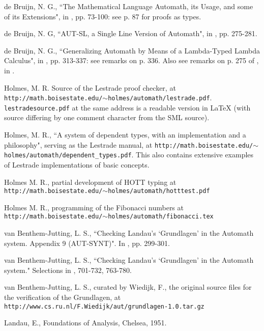 \documentclass{article}
\begin{document}
\begin{thebibliography}{99}

 de Bruijn, N. G., ``The Mathematical Language Automath, its Usage, and some of its Extensions", in \cite{yellowbook}, pp. 73-100:  see p. 87 for proofs as types.

   de Bruijn, N. G, ``AUT-SL, a Single Line Version of Automath", in \cite{yellowbook}, pp. 275-281.

  de Bruijn, N. G., ``Generalizing Automath by Means of a Lambda-Typed Lambda Calculus", in \cite{yellowbook}, pp. 313-337:  see remarks on p. 336.  Also see remarks on p. 275 of \cite{yellowbook}, in \cite{autsl}.

 

  Holmes, M. R.  Source of the Lestrade proof checker, at {\tt http://math.boisestate.edu/$\sim$holmes/automath/lestrade.pdf}.  {\tt lestradesource.pdf}
at the same address is a readable version in LaTeX (with source differing by one comment character from the SML source).

 Holmes, M. R., ``A system of dependent types, with an implementation and a philosophy", serving as the Lestrade manual, at
{\tt  http://math.boisestate.edu/$\sim$holmes/automath/dependent\_types.pdf}.  This also contains extensive examples of Lestrade implementations of basic concepts.

 Holmes M. R., partial development of HOTT typing at  {\tt http://math.boisestate.edu/$\sim$holmes/automath/hotttest.pdf}

  Holmes M. R., programming of the Fibonacci numbers at {\tt http://math.boisestate.edu/$\sim$holmes/automath/fibonacci.tex}

  van Benthem-Jutting, L. S., ``Checking Landau's `Grundlagen' in the Automath system.  Appendix 9 (AUT-SYNT)".  In \cite{yellowbook}, pp. 299-301.

  van Benthem-Jutting, L. S., ``Checking Landau's `Grundlagen' in the Automath system."  Selections in \cite{yellowbook}, 701-732, 763-780.

  van Benthem-Jutting, L. S., curated by Wiedijk, F., the original source files for the verification of the Grundlagen, at {\tt http://www.cs.ru.nl/F.Wiedijk/aut/grundlagen-1.0.tar.gz}

  Landau, E., Foundations of Analysis, Chelsea, 1951.


\end{thebibliography}
\end{document}
